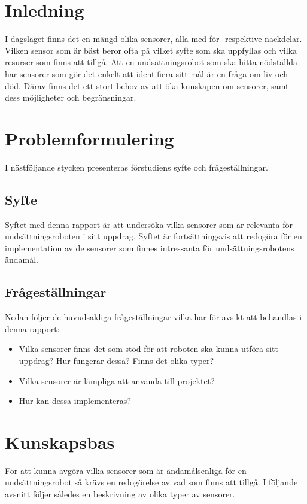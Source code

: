 \documentclass[11pt]{article}
\begin{document}
\begin{flushleft}

\section{Inledning}
I dagsläget finns det en mängd olika sensorer, alla med för- respektive nackdelar. Vilken sensor som är bäst beror ofta på vilket syfte som ska uppfyllas och vilka resurser som finns att tillgå. Att en undsättningsrobot som ska hitta nödställda har sensorer som gör det enkelt att identifiera sitt mål är en fråga om liv och död. Därav finns det ett stort behov av att öka kunskapen om sensorer, samt dess möjligheter och begränsningar.


\section{Problemformulering}
I nästföljande stycken presenteras förstudiens syfte och frågeställningar.

\subsection{Syfte}
Syftet med denna rapport är att undersöka vilka sensorer som är relevanta för undsättningsroboten i sitt uppdrag. Syftet är fortsättningsvis att redogöra för en implementation av de sensorer som finnes intressanta för undsättningsrobotens ändamål.


\subsection{Frågeställningar}
Nedan följer de huvudsakliga frågeställningar vilka har för avsikt att behandlas i denna rapport:



\begin{itemize}

	\item	 Vilka sensorer finns det som stöd för att roboten ska kunna utföra sitt uppdrag? Hur fungerar dessa? Finns det olika typer?
	\item Vilka sensorer är lämpliga att använda till projektet?
	\item Hur kan dessa implementeras? 

\end{itemize}


\pagebreak
\section{Kunskapsbas}
För att kunna avgöra vilka sensorer som är ändamålsenliga för en undsättningsrobot så krävs en redogörelse av vad som finns att tillgå. I följande avsnitt följer således en beskrivning av olika typer av sensorer.


\end{flushleft}
\end{document}
